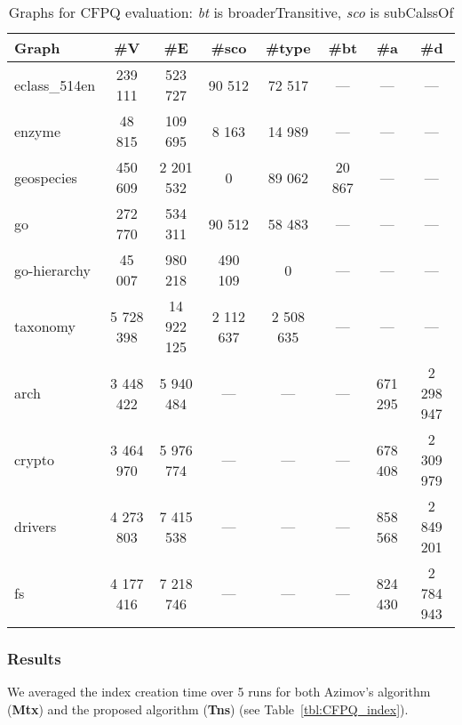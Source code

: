 {\setlength{\tabcolsep}{0.3em}
\begin{table}
{
\caption{Graphs for CFPQ evaluation: \textit{bt} is broaderTransitive, \textit{sco} is subCalssOf}
\label{tbl:graphs_for_cfpq}
\scriptsize
{}
\begin{tabular}{|l|c|c|c|c|c|c|c|}
\hline
Graph          & \#V       & \#E        & \#sco & \#type &\#bt & \#a  & \#d \\
\hline
\hline
eclass\_514en  & 239 111    & 523 727    & 90 512    & 72 517    &        ---        & ---  & --- \\
enzyme         & 48 815     & 109 695    & 8 163     & 14 989    &        ---        & ---  & --- \\
geospecies     & 450 609    & 2 201 532  & 0         & 89 062    &        20 867     & ---  & --- \\
go             & 272 770    & 534 311    & 90 512    & 58 483    &        ---        & ---  & --- \\
go-hierarchy   & 45 007     & 980 218    & 490 109   & 0         &        ---        & ---  & --- \\
taxonomy       & 5 728 398  & 14 922 125 & 2 112 637 & 2 508 635 &        ---        & ---  & --- \\
\hline
arch           & 3 448 422  & 5 940 484  &      ---     &  ---   &        ---        & 671 295 & 2 298 947 \\
crypto         & 3 464 970  & 5 976 774  &      ---     &  ---   &        ---        & 678 408 & 2 309 979 \\
drivers        & 4 273 803  & 7 415 538  &      ---     &  ---   &        ---        & 858 568 & 2 849 201 \\
fs             & 4 177 416  & 7 218 746  &      ---     &  ---   &        ---        & 824 430 & 2 784 943 \\
\hline
\end{tabular}
}
\end{table}
}
\subsubsection{Results}

We averaged the index creation time over 5 runs for both Azimov's algorithm (\textbf{Mtx}) and the proposed algorithm (\textbf{Tns}) (see Table~\ref{tbl:CFPQ_index}).

